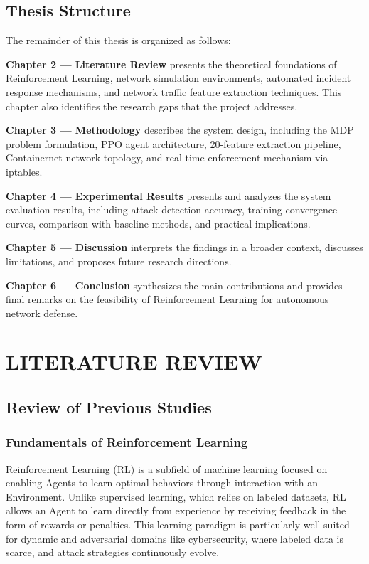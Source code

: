 \documentclass[12pt,a4paper]{report}
\begin{document}
\section{Thesis Structure}

The remainder of this thesis is organized as follows:

\textbf{Chapter 2 --- Literature Review} presents the theoretical foundations of Reinforcement Learning, network simulation environments, automated incident response mechanisms, and network traffic feature extraction techniques. This chapter also identifies the research gaps that the project addresses.

\textbf{Chapter 3 --- Methodology} describes the system design, including the MDP problem formulation, PPO agent architecture, 20-feature extraction pipeline, Containernet network topology, and real-time enforcement mechanism via iptables.

\textbf{Chapter 4 --- Experimental Results} presents and analyzes the system evaluation results, including attack detection accuracy, training convergence curves, comparison with baseline methods, and practical implications.

\textbf{Chapter 5 --- Discussion} interprets the findings in a broader context, discusses limitations, and proposes future research directions.

\textbf{Chapter 6 --- Conclusion} synthesizes the main contributions and provides final remarks on the feasibility of Reinforcement Learning for autonomous network defense.


\chapter{LITERATURE REVIEW}

\section{Review of Previous Studies}

\subsection{Fundamentals of Reinforcement Learning}

Reinforcement Learning (RL) is a subfield of machine learning focused on enabling Agents to learn optimal behaviors through interaction with an Environment. Unlike supervised learning, which relies on labeled datasets, RL allows an Agent to learn directly from experience by receiving feedback in the form of rewards or penalties. This learning paradigm is particularly well-suited for dynamic and adversarial domains like cybersecurity, where labeled data is scarce, and attack strategies continuously evolve.
\end{document}
